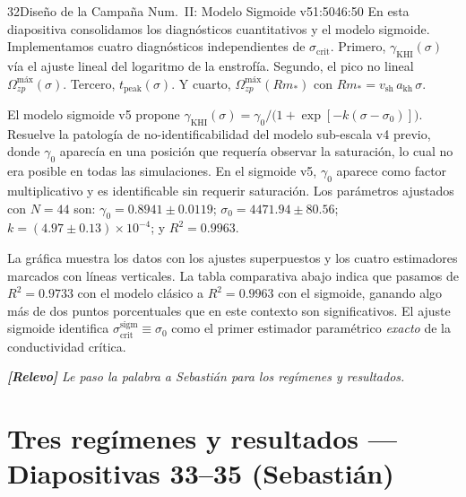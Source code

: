 \documentclass[11pt,a4paper]{article}
\newcommand{\relevo}[1]{%
  \par\medskip
  \noindent\colorbox{tagbg}{\parbox{\dimexpr\linewidth-2\fboxsep\relax}{%
    \small\itshape \textbf{[Relevo]} #1}}\par\medskip}
\begin{document}
\begin{bryorador}{32}{Diseño de la Campaña Num.\ II: Modelo Sigmoide v5}{1:50}{46:50}
En esta diapositiva consolidamos los diagnósticos cuantitativos y el modelo
sigmoide. Implementamos cuatro diagnósticos independientes de
$\sigma_\text{crit}$. Primero, $\gamma_\text{KHI}(\sigma)$ vía el ajuste
lineal del logaritmo de la enstrofía. Segundo, el pico no lineal
$\Omega^\text{máx}_{zp}(\sigma)$. Tercero, $t_\text{peak}(\sigma)$. Y cuarto,
$\Omega^\text{máx}_{zp}(Rm_*)$ con $Rm_*=v_\text{sh}\,a_\text{kh}\,\sigma$.

El modelo sigmoide v5 propone $\gamma_\text{KHI}(\sigma)=\gamma_0/
\bigl(1+\exp[-k(\sigma-\sigma_0)]\bigr)$. Resuelve la patología de
no-identificabilidad del modelo sub-escala v4 previo, donde $\gamma_0$
aparecía en una posición que requería observar la saturación, lo cual no
era posible en todas las simulaciones. En el sigmoide v5, $\gamma_0$ aparece
como factor multiplicativo y es identificable sin requerir saturación. Los
parámetros ajustados con $N=44$ son: $\gamma_0=0.8941\pm 0.0119$;
$\sigma_0=4471.94\pm 80.56$; $k=(4.97\pm 0.13)\times 10^{-4}$; y $R^2=0.9963$.

La gráfica muestra los datos con los ajustes superpuestos y los cuatro
estimadores marcados con líneas verticales. La tabla comparativa abajo
indica que pasamos de $R^2=0.9733$ con el modelo clásico a $R^2=0.9963$ con
el sigmoide, ganando algo más de dos puntos porcentuales que en este
contexto son significativos. El ajuste sigmoide identifica
$\sigma_\text{crit}^\text{sigm}\equiv\sigma_0$ como el primer estimador
paramétrico \emph{exacto} de la conductividad crítica.
\relevo{Le paso la palabra a Sebastián para los regímenes y resultados.}
\end{bryorador}

\section{Tres regímenes y resultados --- Diapositivas 33--35 (Sebastián)}
\end{document}
